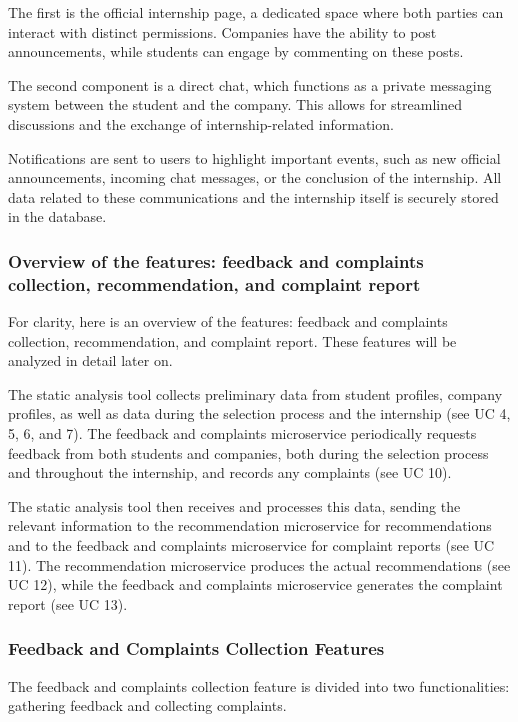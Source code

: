 The first is the official
internship page, a dedicated space where both parties can interact with distinct permissions.
Companies have the ability to post announcements, while students can engage by commenting on
these posts. 

The second component is a direct chat, which functions as a private messaging system between
the student and the company. This allows for streamlined discussions and the exchange of
internship-related information.

Notifications are sent to users to highlight important events, such as new official
announcements, incoming chat messages, or the conclusion of the internship. All data
related to these communications and the internship itself is securely stored in the database.

\subsubsection{Overview of the features: feedback and complaints collection, recommendation,
and complaint report}

For clarity, here is an overview of the features: feedback and complaints collection,
recommendation, and complaint report. These features will be analyzed in detail later on.

The static analysis tool collects preliminary data from student profiles, company profiles,
as well as data during the selection process and the internship (see UC 4, 5, 6, and 7).
The feedback and complaints microservice periodically requests feedback from both students
and companies, both during the selection process and throughout the internship, and records
any complaints (see UC 10).

The static analysis tool then receives and processes this data, sending the relevant
information to the recommendation microservice for recommendations and to the feedback
and complaints microservice for complaint reports (see UC 11). The recommendation
microservice produces the actual recommendations (see UC 12), while the feedback
and complaints microservice generates the complaint report (see UC 13).

\subsubsection{Feedback and Complaints Collection Features}

The feedback and complaints collection feature is divided into two functionalities: gathering
feedback and collecting complaints.

